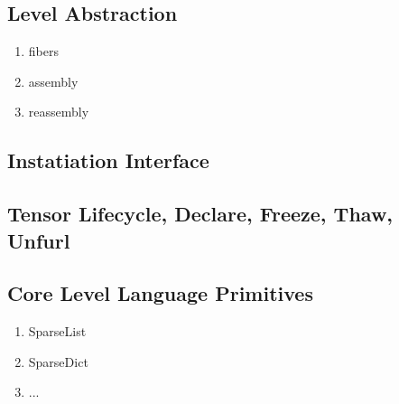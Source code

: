 
\subsection{Level Abstraction}
    
\begin{enumerate}
\item fibers
\item assembly
\item reassembly
\end{enumerate}

\subsection{Instatiation Interface}

\subsection{Tensor Lifecycle, Declare, Freeze, Thaw, Unfurl}


\subsection{Core Level Language Primitives}
\begin{enumerate}
\item SparseList
\item SparseDict
\item ...
\end{enumerate}


